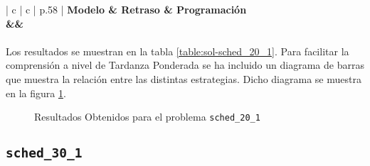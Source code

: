 \documentclass[spanish]{article}
\begin{document}
			\begin{table}[h]
				\centering
				\begin{tabu}{ | c | c | p{.58\linewidth} |}
					\hline
					\bfseries Modelo & \bfseries Retraso & \bfseries Programación
					{\\\hline\model&\delay&\schedule}
					\\\hline
				\end{tabu}
				\caption{Resultados Obtenidos para el problema \texttt{sched\_20\_1}}
				\label{table:sol-sched_20_1}
			\end{table}

			\paragraph{}
			Los resultados se muestran en la tabla \ref{table:sol-sched_20_1}. Para facilitar la comprensión a nivel de Tardanza Ponderada se ha incluido un diagrama de barras que muestra la relación entre las distintas estrategias. Dicho diagrama se muestra en la figura \ref{plot:sol-sched_20_1}.

			\begin{figure}[h]
				\begin{center}
				\end{center}
				\caption{Resultados Obtenidos para el problema \texttt{sched\_20\_1}}
				\label{plot:sol-sched_20_1}
			\end{figure}

		\subsection{\texttt{sched\_30\_1}}
\end{document}
